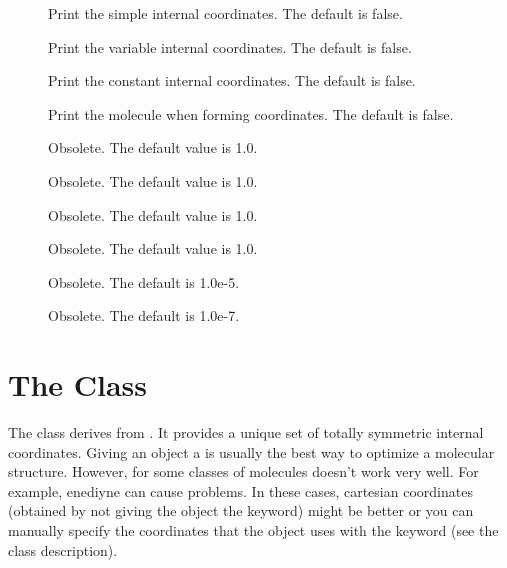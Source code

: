 \begin{description}
  \item[] Print the simple internal coordinates.
     The default is false.
               
  \item[] Print the variable internal
     coordinates.  The default is false.
               
  \item[] Print the constant internal
     coordinates.  The default is false.
               
  \item[] Print the molecule when forming
     coordinates.  The default is false.
               
  \item[] Obsolete.  The default value is 1.0.

  \item[] Obsolete.  The default value is 1.0.
               
  \item[] Obsolete.  The default value is 1.0.

  \item[] Obsolete.  The default value is 1.0.

  \item[] Obsolete.  The default is 1.0e-5.

  \item[] Obsolete.  The default is 1.0e-7.

\end{description}



\section{The  Class}\label{SymmMolecularCoor}

The  class derives from
.  It provides a unique set of totally symmetric
internal coordinates.  Giving an  object a
 is usually the best way to optimize a molecular structure.
However, for some classes of molecules  doesn't
work very well.  For example, enediyne can cause problems.  In these cases,
cartesian coordinates (obtained by not giving the
 object the  keyword) might be better
or you can manually specify the coordinates that the
 object uses with the  keyword
(see the  class description).

